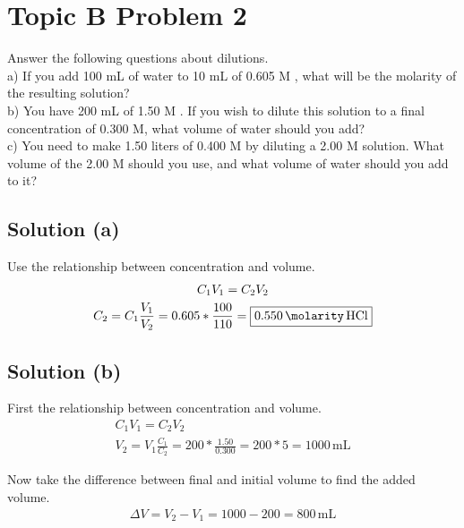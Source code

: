 \documentclass[10pt]{article}
\begin{document}
    \pagebreak
    \section{Topic B Problem 2}
        Answer the following questions about dilutions.\\
        a) If you add 100 mL of water to 10 mL of 0.605 M , what will be the molarity of the resulting solution?\\
        b) You have 200 mL of 1.50 M . 
        If you wish to dilute this solution to a final concentration of 0.300 M, what volume of water should you add?\\
        c) You need to make 1.50 liters of 0.400 M  by diluting a 2.00 M  solution. 
        What volume of the 2.00 M  should you use, and what volume of water should you add to it?

        \subsection{Solution (a)}
            Use the relationship between concentration and volume.
            \begin{gather}
                C_1 V_1 =   C_2 V_2\\
                C_2 =   C_1 \frac{V_1}{V_2}
                    =   0.605 * \frac{100}{110}
                    =   \boxed{0.550\,\unit{\molarity}\,\ce{HCl}}
            \end{gather}

        \subsection{Solution (b)}
            First the relationship between concentration and volume.
            \begin{gather}
                C_1 V_1 =   C_2 V_2\\
                V_2 =   V_1 \frac{C_1}{C_2}
                    =   200 * \frac{1.50}{0.300}
                    =   200 * 5
                    =   1000\,\unit{\milli\liter}
            \end{gather}

            Now take the difference between final and initial volume to find the added volume.
            \begin{gather}
                \Delta V    =   V_2 - V_1
                    =   1000 - 200
                    =   \boxed{800\,\unit{\milli\liter}}
            \end{gather}
\end{document}
